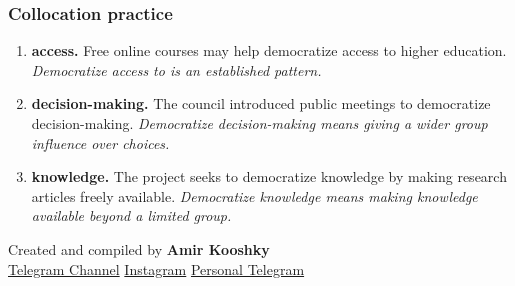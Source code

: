 \documentclass[11pt]{article}
\begin{document}
\subsubsection{Collocation practice}
\begin{enumerate}
  \item \textbf{access.} Free online courses may help democratize access to higher education. \emph{Democratize access to is an established pattern.}
  \item \textbf{decision-making.} The council introduced public meetings to democratize decision-making. \emph{Democratize decision-making means giving a wider group influence over choices.}
  \item \textbf{knowledge.} The project seeks to democratize knowledge by making research articles freely available. \emph{Democratize knowledge means making knowledge available beyond a limited group.}
\end{enumerate}

\vfill
\begin{center}
\small\color{Muted} Created and compiled by \textbf{Amir Kooshky}\\
\href{https://t.me/KooshkyTOEFL}{Telegram Channel}\quad\textbullet\quad
\href{https://www.instagram.com/kooshkytoefl}{Instagram}\quad\textbullet\quad
\href{https://t.me/KooshkyTOEFL\_pv}{Personal Telegram}
\end{center}
\end{document}
